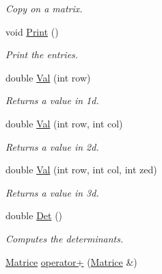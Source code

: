 \begin{DoxyCompactItemize}
\begin{DoxyCompactList}\small\item\em Copy on a matrix. \end{DoxyCompactList}\item 
void \hyperlink{classMatrice_a9dcac18006ce057b8d78c847174c1362}{Print} ()\hypertarget{classMatrice_a9dcac18006ce057b8d78c847174c1362}{}\label{classMatrice_a9dcac18006ce057b8d78c847174c1362}

\begin{DoxyCompactList}\small\item\em Print the entries. \end{DoxyCompactList}\item 
double \hyperlink{classMatrice_a2a233d9af97c320a1b372ededf056886}{Val} (int row)\hypertarget{classMatrice_a2a233d9af97c320a1b372ededf056886}{}\label{classMatrice_a2a233d9af97c320a1b372ededf056886}

\begin{DoxyCompactList}\small\item\em Returns a value in 1d. \end{DoxyCompactList}\item 
double \hyperlink{classMatrice_a3186a2a78ed4c487f22fb21081e3909a}{Val} (int row, int col)\hypertarget{classMatrice_a3186a2a78ed4c487f22fb21081e3909a}{}\label{classMatrice_a3186a2a78ed4c487f22fb21081e3909a}

\begin{DoxyCompactList}\small\item\em Returns a value in 2d. \end{DoxyCompactList}\item 
double \hyperlink{classMatrice_a73cd8ec182ae5748a462a9b724b664ff}{Val} (int row, int col, int zed)\hypertarget{classMatrice_a73cd8ec182ae5748a462a9b724b664ff}{}\label{classMatrice_a73cd8ec182ae5748a462a9b724b664ff}

\begin{DoxyCompactList}\small\item\em Returns a value in 3d. \end{DoxyCompactList}\item 
double \hyperlink{classMatrice_ae9aabce3db6cb0b00f6e79f9c6f7fd05}{Det} ()\hypertarget{classMatrice_ae9aabce3db6cb0b00f6e79f9c6f7fd05}{}\label{classMatrice_ae9aabce3db6cb0b00f6e79f9c6f7fd05}

\begin{DoxyCompactList}\small\item\em Computes the determinants. \end{DoxyCompactList}\item 
\hyperlink{classMatrice}{Matrice} \hyperlink{classMatrice_a1f8738463e0e7eb8be57bf909bcd7ce0}{operator+} (\hyperlink{classMatrice}{Matrice} \&)\hypertarget{classMatrice_a1f8738463e0e7eb8be57bf909bcd7ce0}{}\label{classMatrice_a1f8738463e0e7eb8be57bf909bcd7ce0}


\end{DoxyCompactItemize}
